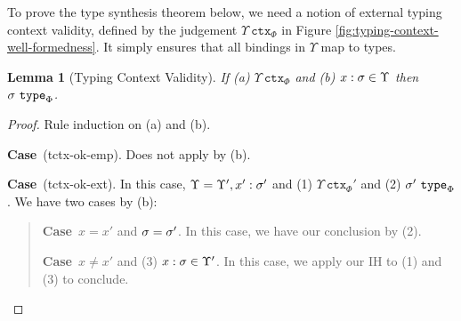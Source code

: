\documentclass[12pt]{article}
\newtheorem{lemma}{Lemma}
\newcommand{\pfcase}[1]{\textbf{Case}~#1. }
\begin{document}
To prove the type synthesis theorem below, we need a notion of external typing context validity, defined by the judgement $\Upsilon~\mathtt{ctx}_{\Phi}$ in Figure \ref{fig:typing-context-well-formedness}. It simply ensures that all bindings in $\Upsilon$ map to types.


\begin{lemma}[Typing Context Validity]
\label{lemma:typing-context-validity}
If (a) $\Upsilon~\mathtt{ctx}_{\Phi}$ and (b) $x : \sigma \in \Upsilon$ then $\sigma~\mathtt{type}_{\Phi}$.
\end{lemma}
\begin{proof} Rule induction on (a) and (b).

\pfcase{(tctx-ok-emp)} Does not apply by (b).

\pfcase{(tctx-ok-ext)} In this case, $\Upsilon=\Upsilon', x' : \sigma'$ and (1) $\Upsilon~\mathtt{ctx}_{\Phi}'$ and (2) $\sigma'~\mathtt{type}_{\Phi}$. We have two cases by (b):

\begin{quote}
    \pfcase{$x = x'$ and $\sigma=\sigma'$} In this case, we have our conclusion by (2).

    \pfcase{$x \neq x'$ and (3) $x : \sigma \in \Upsilon'$} In this case, we apply our IH to (1) and (3) to conclude.
\end{quote}
\end{proof}
\end{document}
